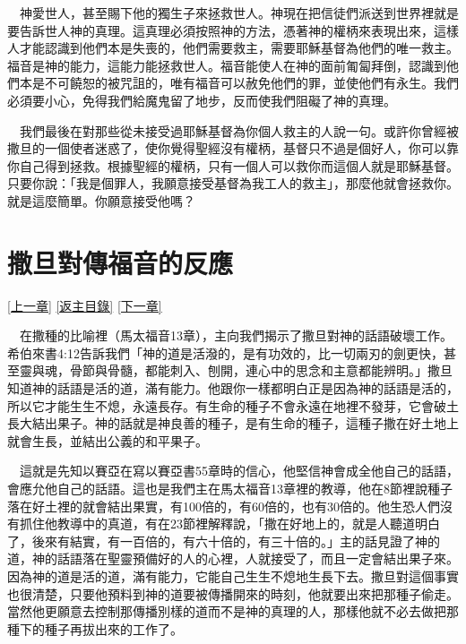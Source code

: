 \documentclass{book}
\begin{document}
　神愛世人，甚至賜下他的獨生子來拯救世人。神現在把信徒們派送到世界裡就是要告訴世人神的真理。這真理必須按照神的方法，憑著神的權柄來表現出來，這樣人才能認識到他們本是失喪的，他們需要救主，需要耶穌基督為他們的唯一救主。福音是神的能力，這能力能拯救世人。福音能使人在神的面前匍匐拜倒，認識到他們本是不可饒恕的被咒詛的，唯有福音可以赦免他們的罪，並使他們有永生。我們必須要小心，免得我們給魔鬼留了地步，反而使我們阻礙了神的真理。

　我們最後在對那些從未接受過耶穌基督為你個人救主的人說一句。或許你曾經被撒旦的一個使者迷惑了，使你覺得聖經沒有權柄，基督只不過是個好人，你可以靠你自己得到拯救。根據聖經的權柄，只有一個人可以救你而這個人就是耶穌基督。只要你說：「我是個罪人，我願意接受基督為我工人的救主」，那麼他就會拯救你。就是這麼簡單。你願意接受他嗎？

\chapter{撒旦對傳福音的反應}
\label{sec:ch12}
\hyperref[sec:ch11]{[上一章]}
\hyperlink{toc}{[返主目錄]}
\hyperref[sec:ch13]{[下一章]}

\begin{center}
\noindent{}
\end{center}

　在撒種的比喻裡（馬太福音13章），主向我們揭示了撒旦對神的話語破壞工作。希伯來書4:12告訴我們「神的道是活潑的，是有功效的，比一切兩刃的劍更快，甚至靈與魂，骨節與骨髓，都能刺入、刨開，連心中的思念和主意都能辨明。」撒旦知道神的話語是活的道，滿有能力。他跟你一樣都明白正是因為神的話語是活的，所以它才能生生不熄，永遠長存。有生命的種子不會永遠在地裡不發芽，它會破土長大結出果子。神的話就是神良善的種子，是有生命的種子，這種子撒在好土地上就會生長，並結出公義的和平果子。

　這就是先知以賽亞在寫以賽亞書55章時的信心，他堅信神會成全他自己的話語，會應允他自己的話語。這也是我們主在馬太福音13章裡的教導，他在8節裡說種子落在好土裡的就會結出果實，有100倍的，有60倍的，也有30倍的。他生恐人們沒有抓住他教導中的真道，有在23節裡解釋說，「撒在好地上的，就是人聽道明白了，後來有結實，有一百倍的，有六十倍的，有三十倍的。」主的話見證了神的道，神的話語落在聖靈預備好的人的心裡，人就接受了，而且一定會結出果子來。因為神的道是活的道，滿有能力，它能自己生生不熄地生長下去。撒旦對這個事實也很清楚，只要他預料到神的道要被傳播開來的時刻，他就要出來把那種子偷走。當然他更願意去控制那傳播別樣的道而不是神的真理的人，那樣他就不必去做把那種下的種子再拔出來的工作了。
\end{document}

